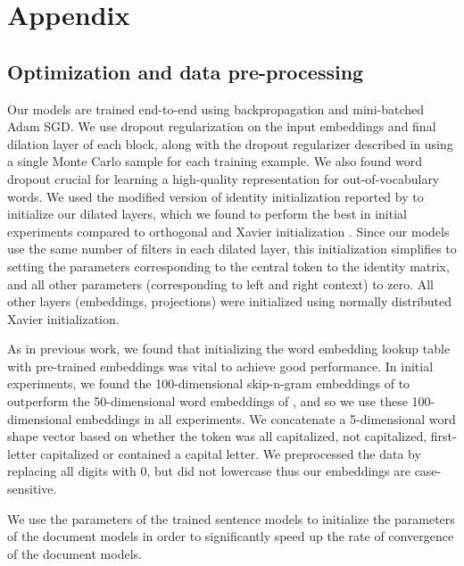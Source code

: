 \clearpage
\newpage

\appendix

\section{Appendix}

\subsection{Optimization and data pre-processing}
Our models are trained end-to-end using backpropagation and mini-batched Adam \citep{kingma2014adam} SGD. We use dropout regularization \citep{srivastava2014dropout} on the input embeddings and final dilation layer of each block, along with the dropout regularizer described in \citet{ma2017dropout} using a single Monte Carlo sample for each training example. We also found word dropout \citep{dai2015semi,lample2016neural} crucial for learning a high-quality representation for out-of-vocabulary words. We used the modified version of identity initialization \citep{le2015simple} reported by \citet{yu2015multi} to initialize our dilated layers, which we found to perform the best in initial experiments compared to orthogonal and Xavier initialization \citep{glorot2010understanding}. Since our models use the same number of filters in each dilated layer, this initialization simplifies to setting the parameters corresponding to the central token to the identity matrix, and all other parameters (corresponding to left and right context) to zero. All other layers (embeddings, projections) were initialized using normally distributed Xavier initialization. 

As in previous work, we found that initializing the word embedding lookup table with pre-trained embeddings was vital to achieve good performance. In initial experiments, we found the 100-dimensional skip-n-gram \citep{wang2015not} embeddings of \citet{lample2016neural} to outperform the 50-dimensional word embeddings of \citet{collobert2011natural}, and so we use these 100-dimensional embeddings in all experiments. We concatenate a 5-dimensional word shape vector based on whether the token was all capitalized, not capitalized, first-letter capitalized or contained a capital letter. We preprocessed the data by replacing all digits with 0, but did not lowercase thus our embeddings are case-sensitive.

We use the parameters of the trained sentence models to initialize the parameters of the document models in order to significantly speed up the rate of convergence of the document models. 

